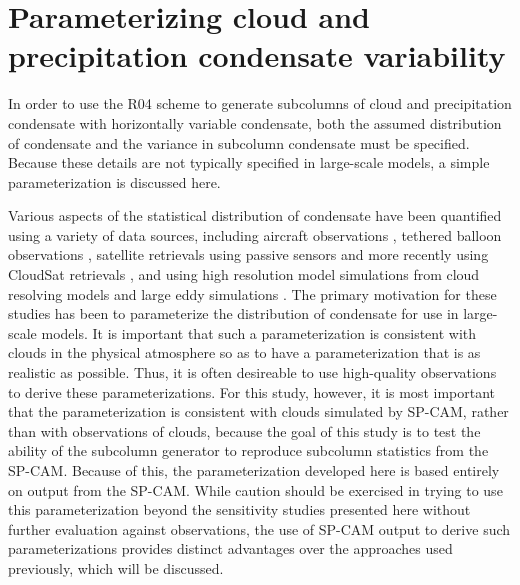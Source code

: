 \section{Parameterizing cloud and precipitation condensate
variability}\label{sec:subgrid2Variability}

In order to use the R04 scheme to generate subcolumns of cloud and
precipitation condensate with horizontally variable condensate, both the
assumed distribution of condensate and the variance in subcolumn
condensate must be specified. Because these details are not typically
specified in large-scale models, a simple parameterization is discussed
here.

Various aspects of the statistical distribution of condensate have been
quantified using a variety of data sources, including aircraft
observations \citep{wood_and_field_2000, larson_et_al_2001}, tethered
balloon observations \citep{price_2001}, satellite retrievals using
passive sensors \citep{barker_et_al_1996} and more recently using
CloudSat retrievals \citep{lee_et_al_2010}, and using high resolution
model simulations from cloud resolving models and large eddy simulations
\citep{lewellen_and_yoh_1993, xu_and_randall_1996a, xu_and_randall_1996b}.
The primary motivation for these studies has been to parameterize the
distribution of condensate for use in large-scale models. It is
important that such a parameterization is consistent with clouds in the
physical atmosphere so as to have a parameterization that is as
realistic as possible. Thus, it is often desireable to use high-quality
observations to derive these parameterizations. For this study, however,
it is most important that the parameterization is consistent with clouds
simulated by SP-CAM, rather than with observations of clouds, because
the goal of this study is to test the ability of the subcolumn generator
to reproduce subcolumn statistics from the SP-CAM. Because of this, the
parameterization developed here is based entirely on output from the
SP-CAM. While caution should be exercised in trying to use this
parameterization beyond the sensitivity studies presented here without
further evaluation against observations, the use of SP-CAM output to
derive such parameterizations provides distinct advantages over the
approaches used previously, which will be discussed.

